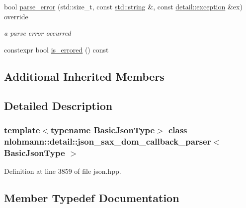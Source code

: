 \begin{DoxyCompactItemize}
bool \hyperlink{classnlohmann_1_1detail_1_1json__sax__dom__callback__parser_ad3a854f01133e12ec79139f3207e1720}{parse\+\_\+error} (std\+::size\+\_\+t, const \hyperlink{namespacenlohmann_1_1detail_a1ed8fc6239da25abcaf681d30ace4985ab45cffe084dd3d20d928bee85e7b0f21}{std\+::string} \&, const \hyperlink{classnlohmann_1_1detail_1_1exception}{detail\+::exception} \&ex) override
\begin{DoxyCompactList}\small\item\em a parse error occurred \end{DoxyCompactList}\item 
constexpr bool \hyperlink{classnlohmann_1_1detail_1_1json__sax__dom__callback__parser_a167fd9bf385d3d08bcbbba8a927c0eff}{is\+\_\+errored} () const
\end{DoxyCompactItemize}
\subsection*{Additional Inherited Members}


\subsection{Detailed Description}
\subsubsection*{template$<$typename Basic\+Json\+Type$>$\newline
class nlohmann\+::detail\+::json\+\_\+sax\+\_\+dom\+\_\+callback\+\_\+parser$<$ Basic\+Json\+Type $>$}



Definition at line 3859 of file json.\+hpp.



\subsection{Member Typedef Documentation}
\mbox{\label{classnlohmann_1_1detail_1_1json__sax__dom__callback__parser_a914ea0555cea5290449fb791ae41c655}} 
